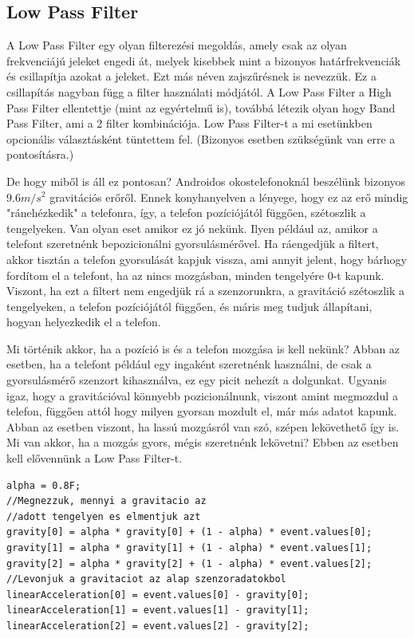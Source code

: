\documentclass{thesis-ekf}
\theoremstyle{definition}
\theoremstyle{remark}
\begin{document}
\subsection{Low Pass Filter}
A Low Pass Filter egy olyan filterezési megoldás, amely csak az olyan frekvenciájú jeleket engedi át, melyek kisebbek mint a bizonyos határfrekvenciák és csillapítja azokat a jeleket. Ezt más néven zajszűrésnek is nevezzük. Ez a csillapítás nagyban függ a filter használati módjától. A Low Pass Filter a High Pass Filter ellentettje (mint az egyértelmű is), továbbá létezik olyan hogy Band Pass Filter, ami a 2 filter kombinációja. Low Pass Filter-t a mi esetünkben opcionális választásként tüntettem fel. (Bizonyos esetben szükségünk van erre a pontosításra.)
\par De hogy miből is áll ez pontosan? Androidos okostelefonoknál beszélünk bizonyos $9.6 m/s^2$ gravitációs erőről. Ennek konyhanyelven a lényege, hogy ez az erő mindig "ránehézkedik" a telefonra, így, a telefon pozíciójától függően, szétoszlik a tengelyeken. Van olyan eset amikor ez jó nekünk. Ilyen például az, amikor a telefont szeretnénk bepozicionálni gyorsulásmérővel. Ha ráengedjük a filtert, akkor tisztán a telefon gyorsulását kapjuk vissza, ami annyit jelent, hogy bárhogy fordítom el a telefont, ha az nincs mozgásban, minden tengelyére 0-t kapunk. Viszont, ha ezt a filtert nem engedjük rá a szenzorunkra, a gravitáció szétoszlik a tengelyeken, a telefon pozíciójától függően, és máris meg tudjuk állapítani, hogyan helyezkedik el a telefon.
\par Mi történik akkor, ha a pozíció is és a telefon mozgása is kell nekünk? Abban az esetben, ha a telefont például egy ingaként szeretnénk használni, de csak a gyorsulásmérő szenzort kihasználva, ez egy picit nehezít a dolgunkat. Ugyanis igaz, hogy a gravitációval könnyebb pozicionálnunk, viszont amint megmozdul a telefon, függően attól hogy milyen gyorsan mozdult el, már más adatot kapunk. Abban az esetben viszont, ha lassú mozgásról van szó, szépen lekövethető így is. Mi van akkor, ha a mozgás gyors, mégis szeretnénk lekövetni? Ebben az esetben kell elővennünk a Low Pass Filter-t.
\begin{lstlisting}
alpha = 0.8F;
//Megnezzuk, mennyi a gravitacio az
//adott tengelyen es elmentjuk azt
gravity[0] = alpha * gravity[0] + (1 - alpha) * event.values[0];
gravity[1] = alpha * gravity[1] + (1 - alpha) * event.values[1];
gravity[2] = alpha * gravity[2] + (1 - alpha) * event.values[2];
//Levonjuk a gravitaciot az alap szenzoradatokbol
linearAcceleration[0] = event.values[0] - gravity[0];
linearAcceleration[1] = event.values[1] - gravity[1];
linearAcceleration[2] = event.values[2] - gravity[2];
\end{lstlisting}
\end{document}
